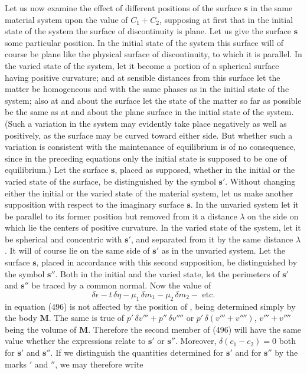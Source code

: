 \documentclass[12pt]{article}
\newcommand{\dd}{\delta}
\begin{document}
{Let us now examine the effect of different positions of the surface $\mathbf{s}$ in the same material system upon the value of $C_1 +C_2$, supposing at first that in the initial state of the system the surface of discontinuity is plane. Let us give the surface $\mathbf{s}$ some particular position. In the initial state of the system this surface will of course be plane like the physical surface of discontinuity, to which it is parallel. In the varied state of the system, let it become a portion of a spherical surface having positive curvature; and at sensible distances from this surface let the matter be homogeneous and with the same phases as in the initial state of the system; also at and about the surface let the state of the matter so far as possible be the same as at and about the plane surface in the initial state of the system. (Such a variation in the system may evidently take place negatively as well as positively, as the surface may be curved toward either side. But whether such a variation is consistent with the maintenance of equilibrium is of no consequence, since in the preceding equations only the initial state is supposed to be one of equilibrium.) Let the surface $\mathbf{s}$, placed as supposed, whether in the initial or the varied state of the surface, be distinguished by the symbol $\mathbf{s}'$. Without changing either the initial or the varied state of the material system, let us make another supposition with respect to the imaginary surface $\mathbf{s}$. In the unvaried system let it be parallel to its former position but removed from it a distance $\lambda$ on the side on which lie the centers of positive curvature. In the varied state of the system, let it be spherical and concentric with $\mathbf{s}'$, and separated from it by the same distance $\lambda$. It will of course lie on the same side of $\mathbf{s}'$ as in the unvaried system. Let the surface $\mathbf{s}$, placed in accordance with this second supposition, be distinguished by the symbol $\mathbf{s}''$. Both in the initial and the varied state, let the perimeters of $\mathbf{s}'$ and $\mathbf{s}''$ be traced by a common normal. Now the value of
$$ \dd \epsilon - t \, \dd \eta- \mu_1 \, \dd m_1 - \mu_2 \, \dd m_2 - \text{ etc.} $$
in equation (496) is not affected by the position of , being determined simply by the body $\mathbf{M}$. The same is true of $p'\, \dd v'''+p''\, \dd v''''$ or $p'\, \dd (v''' +v'''')$, $v'''+ v''''$ being the volume of $\mathbf{M}$. Therefore the second member of (496) will have the same value whether the expressions relate to $\mathbf{s}'$ or $\mathbf{s}''$.  Moreover, $\dd(c_1 -c_2)=0$ both for $\mathbf{s}'$ and $\mathbf{s}''$. If we distinguish the quantities determined for $\mathbf{s}'$ and for $\mathbf{s}''$ by the marks $'$ and $''$, we may therefore write
}
\end{document}
